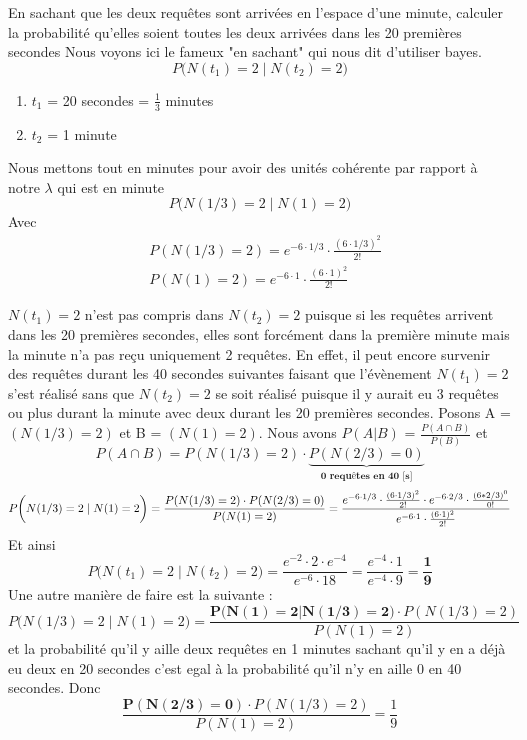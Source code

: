 \begin{exo}
\begin{subexo}{En sachant que les deux requêtes sont arrivées en l'espace d'une minute, calculer
      la probabilité qu'elles soient toutes les deux arrivées dans les 20 premières secondes}
    Nous voyons ici le fameux "en sachant" qui nous dit d'utiliser bayes.
    \[
      P\biggl( N(t_1) = 2 \mid N(t_2) = 2\biggr)
    \]
    \begin{enumerate}
      \item $t_1$ = 20 secondes = $\frac{1}{3}$ minutes
      \item $t_2$ = 1 minute
    \end{enumerate}
    Nous mettons tout en minutes pour avoir des unités cohérente par rapport à notre $\lambda$ qui est en minute
    \begin{equation*}
      P\biggl( N(1/3) = 2 \mid N(1) = 2\biggr)
    \end{equation*}
    Avec
    \begin{align*}
       & P(N(1/3) = 2) = e^{-6 \cdot 1/3} \cdot \frac{(6 \cdot 1/3)^2}{2 !} \\
       & P(N(1) = 2) = e^{-6 \cdot 1} \cdot \frac{(6 \cdot 1)^2}{2 !}
    \end{align*}

    $N(t_1) = 2$ n'est pas compris dans $N(t_2) = 2$ puisque si les requêtes
    arrivent dans les 20 premières secondes, elles sont forcément dans la première minute
    mais la minute n'a pas reçu uniquement 2 requêtes.
    En effet, il peut encore survenir des requêtes durant les 40 secondes suivantes faisant que
    l'évènement $N(t_1) = 2$ s'est réalisé sans que $N(t_2) = 2$ se soit réalisé puisque il y
    aurait eu 3 requêtes ou plus durant la minute avec deux durant les 20 premières secondes.
    Posons A = $(N(1/3) = 2)$ et B = $ (N(1) = 2)$.
    Nous avons $P( A | B)$ = $\frac{P(A \cap B)}{P(B)}$ et
    \[P(A \cap B) = P(N(1/3) = 2) \cdot \underbrace{P(N(2/3)= 0)}_{\textbf{0 requêtes en 40 [s]}}\]
    \begin{equation*}
      P\biggl( N(1/3) = 2 \mid N(1) = 2\biggr) 
      =\frac{P(N(1/3) = 2)\cdot P(N(2/3)= 0)}
          {P(N(1) = 2)} 
          \\
      = \frac{ e^{-6 \cdot 1/3} \cdot \frac{(6 \cdot 1/3)^2}{2 !} \cdot e^{-6\cdot 2/3}\cdot \frac{(6*2/3)^0}{0!}}{ e^{-6 \cdot 1} \cdot \frac{(6 \cdot 1)^2}{2 !} }
    \end{equation*}
    Et ainsi
    \[
      P\biggl( N(t_1) = 2 \mid N(t_2) = 2\biggr) = \frac{e^{-2}\cdot 2 \cdot e^{-4}}{e^{-6}\cdot 18} = \frac{e^{-4}\cdot 1}{e^{-4}\cdot 9} = \frac{\textbf{1}}{\textbf{9}}
    \]
    Une autre manière de faire est la suivante :
    \[
      P\biggl(N(1/3)=2 \mid N(1)=2 \biggr)= \frac{\mathbf{P\bigl( N(1)=2 | N(1/3)=2\bigr)} \cdot P(N(1/3)=2)}{P(N(1)=2)}
    \]
    et la probabilité qu'il y aille deux requêtes en 1 minutes sachant qu'il y en a déjà eu deux en 20 secondes
    c'est egal à la probabilité qu'il n'y en aille 0 en 40 secondes. Donc
    \[ \frac{\mathbf{P(N(2/3)=0)} \cdot P( N(1/3) = 2)}{P(N(1)=2)} = \frac{1}{9}\]
  \end{subexo}
\end{exo}
